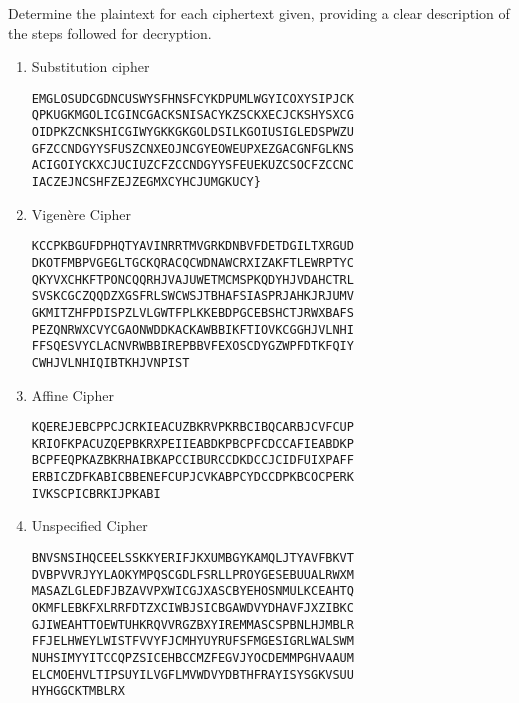 \begin{statement}{1.21}
  Determine the plaintext for each ciphertext given, providing a clear description of
  the steps followed for decryption.

  \begin{enumerate}[label=(\alph*)]
    \item Substitution cipher

\begin{verbatim}
EMGLOSUDCGDNCUSWYSFHNSFCYKDPUMLWGYICOXYSIPJCK
QPKUGKMGOLICGINCGACKSNISACYKZSCKXECJCKSHYSXCG
OIDPKZCNKSHICGIWYGKKGKGOLDSILKGOIUSIGLEDSPWZU
GFZCCNDGYYSFUSZCNXEOJNCGYEOWEUPXEZGACGNFGLKNS
ACIGOIYCKXCJUCIUZCFZCCNDGYYSFEUEKUZCSOCFZCCNC
IACZEJNCSHFZEJZEGMXCYHCJUMGKUCY}
\end{verbatim}
              
  \item Vigen\`{e}re Cipher

\begin{verbatim}
KCCPKBGUFDPHQTYAVINRRTMVGRKDNBVFDETDGILTXRGUD
DKOTFMBPVGEGLTGCKQRACQCWDNAWCRXIZAKFTLEWRPTYC
QKYVXCHKFTPONCQQRHJVAJUWETMCMSPKQDYHJVDAHCTRL
SVSKCGCZQQDZXGSFRLSWCWSJTBHAFSIASPRJAHKJRJUMV
GKMITZHFPDISPZLVLGWTFPLKKEBDPGCEBSHCTJRWXBAFS
PEZQNRWXCVYCGAONWDDKACKAWBBIKFTIOVKCGGHJVLNHI
FFSQESVYCLACNVRWBBIREPBBVFEXOSCDYGZWPFDTKFQIY
CWHJVLNHIQIBTKHJVNPIST
\end{verbatim}

\item  Affine Cipher

\begin{verbatim}
KQEREJEBCPPCJCRKIEACUZBKRVPKRBCIBQCARBJCVFCUP
KRIOFKPACUZQEPBKRXPEIIEABDKPBCPFCDCCAFIEABDKP
BCPFEQPKAZBKRHAIBKAPCCIBURCCDKDCCJCIDFUIXPAFF
ERBICZDFKABICBBENEFCUPJCVKABPCYDCCDPKBCOCPERK
IVKSCPICBRKIJPKABI
\end{verbatim}

\item Unspecified Cipher

\begin{verbatim}
BNVSNSIHQCEELSSKKYERIFJKXUMBGYKAMQLJTYAVFBKVT
DVBPVVRJYYLAOKYMPQSCGDLFSRLLPROYGESEBUUALRWXM
MASAZLGLEDFJBZAVVPXWICGJXASCBYEHOSNMULKCEAHTQ
OKMFLEBKFXLRRFDTZXCIWBJSICBGAWDVYDHAVFJXZIBKC
GJIWEAHTTOEWTUHKRQVVRGZBXYIREMMASCSPBNLHJMBLR
FFJELHWEYLWISTFVVYFJCMHYUYRUFSFMGESIGRLWALSWM
NUHSIMYYITCCQPZSICEHBCCMZFEGVJYOCDEMMPGHVAAUM
ELCMOEHVLTIPSUYILVGFLMVWDVYDBTHFRAYISYSGKVSUU
HYHGGCKTMBLRX
\end{verbatim}
\end{enumerate}
\end{statement}
